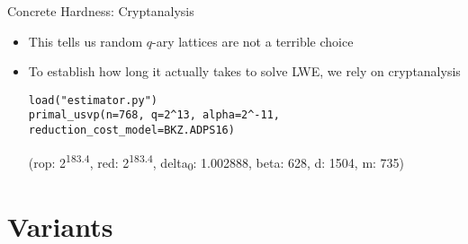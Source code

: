 \documentclass[xcolor=table,10pt,aspectratio=169]{beamer}
\begin{document}
\begin{frame}[label={sec:org9e04fca},fragile]{Concrete Hardness: Cryptanalysis}
 \begin{itemize}
\item This tells us random \(q\)-ary lattices are not a terrible choice
\item To establish how long it actually takes to solve LWE, we rely on cryptanalysis
\lstset{language=sage,label= ,caption= ,captionpos=b,numbers=none}
\begin{lstlisting}
load("estimator.py")
primal_usvp(n=768, q=2^13, alpha=2^-11, reduction_cost_model=BKZ.ADPS16)
\end{lstlisting}
(rop: 2\textsuperscript{183.4}, red: 2\textsuperscript{183.4}, delta\textsubscript{0}: 1.002888, beta:  628, d: 1504, m: 735)
\end{itemize}

\end{frame}

\section{Variants}
\label{sec:org1a931be}
\end{document}
